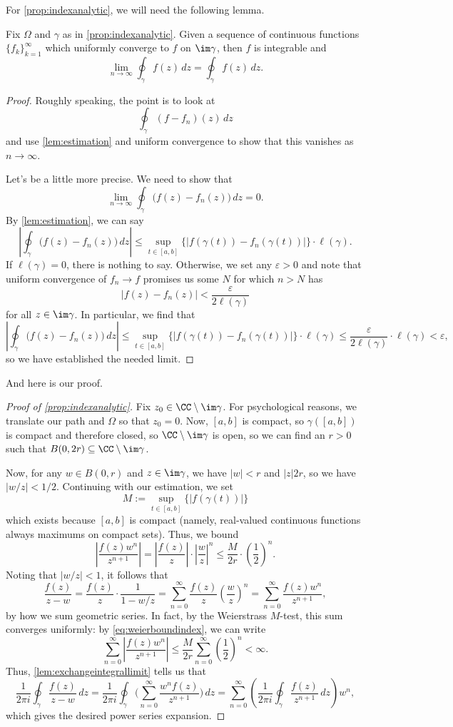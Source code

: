 For \autoref{prop:indexanalytic}, we will need the following lemma.
\begin{lemma} \label{lem:exchangeintegrallimit}
	Fix $\Omega$ and $\gamma$ as in \autoref{prop:indexanalytic}. Given a sequence of continuous functions $\{f_k\}_{k=1}^\infty$ which uniformly converge to $f$ on $\im\gamma$, then $f$ is integrable and
	\[\lim_{n\to\infty}\oint_\gamma f(z)\,dz=\oint_\gamma f(z)\,dz.\]
\end{lemma}
\begin{proof}
	Roughly speaking, the point is to look at
	\[\oint_\gamma(f-f_n)(z)\,dz\]
	and use \autoref{lem:estimation} and uniform convergence to show that this vanishes as $n\to\infty$.

	Let's be a little more precise. We need to show that
	\[\lim_{n\to\infty}\oint_\gamma\big(f(z)-f_n(z)\big)\,dz=0.\]
	By \autoref{lem:estimation}, we can say
	\[\left|\oint_\gamma\big(f(z)-f_n(z)\big)\,dz\right|\le\sup_{t\in[a,b]}\{|f(\gamma(t))-f_n(\gamma(t))|\}\cdot\ell(\gamma).\]
	If $\ell(\gamma)=0$, there is nothing to say. Otherwise, we set any $\varepsilon>0$ and note that uniform convergence of $f_n\to f$ promises us some $N$ for which $n>N$ has
	\[|f(z)-f_n(z)|<\frac{\varepsilon}{2\ell(\gamma)}\]
	for all $z\in\im\gamma$. In particular, we find that
	\[\left|\oint_\gamma\big(f(z)-f_n(z)\big)\,dz\right|\le\sup_{t\in[a,b]}\{|f(\gamma(t))-f_n(\gamma(t))|\}\cdot\ell(\gamma)\le\frac\varepsilon{2\ell(\gamma)}\cdot\ell(\gamma)<\varepsilon,\]
	so we have established the needed limit.
\end{proof}
And here is our proof.
\begin{proof}[Proof of \autoref{prop:indexanalytic}]
	Fix $z_0\in\CC\setminus\im\gamma$. For psychological reasons, we translate our path and $\Omega$ so that $z_0=0$. Now, $[a,b]$ is compact, so $\gamma([a,b])$ is compact and therefore closed, so $\CC\setminus\im\gamma$ is open, so we can find an $r>0$ such that $B(0,2r)\subseteq\CC\setminus\im\gamma$.

	Now, for any $w\in B(0,r)$ and $z\in\im\gamma$, we have $|w|<r$ and $|z|2r$, so we have $|w/z|<1/2$. Continuing with our estimation, we set
	\[M:=\sup_{t\in[a,b]}\{|f(\gamma(t))|\}\]
	which exists because $[a,b]$ is compact (namely, real-valued continuous functions always maximums on compact sets). Thus, we bound
	\[\left|\frac{f(z)w^n}{z^{n+1}}\right|=\left|\frac{f(z)}z\right|\cdot\left|\frac wz\right|^n\le\frac M{2r}\cdot\left(\frac12\right)^n.\tag{$*$}\label{eq:weierboundindex}\]
	Noting that $|w/z|<1$, it follows that
	\[\frac{f(z)}{z-w}=\frac{f(z)}z\cdot\frac1{1-w/z}=\sum_{n=0}^\infty\frac{f(z)}z\left(\frac wz\right)^n=\sum_{n=0}^\infty\frac{f(z)w^n}{z^{n+1}},\]
	by how we sum geometric series. In fact, by the Weierstrass $M$-test, this sum converges uniformly: by \autoref{eq:weierboundindex}, we can write
	\[\sum_{n=0}^\infty\left|\frac{f(z)w^n}{z^{n+1}}\right|\le\frac M{2r}\sum_{n=0}^\infty\left(\frac12\right)^n<\infty.\]
	Thus, \autoref{lem:exchangeintegrallimit} tells us that
	\[\frac1{2\pi i}\oint_\gamma\frac{f(z)}{z-w}\,dz=\frac1{2\pi i}\oint_\gamma\Bigg(\sum_{n=0}^\infty\frac{w^nf(z)}{z^{n+1}}\Bigg)\,dz=\sum_{n=0}^\infty\left(\frac1{2\pi i}\oint_\gamma\frac{f(z)}{z^{n+1}}\,dz\right)w^n,\]
	which gives the desired power series expansion.
\end{proof}